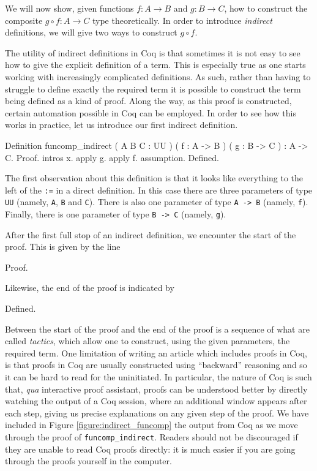 We will now show, given functions $f:A\to B$ and $g:B\to C$, how to
construct the composite $g\circ f : A \to C$ type theoretically.  In
order to introduce \emph{indirect} definitions, we will give two
ways to construct $g\circ f$.

The utility of indirect definitions in Coq is that sometimes it is not
easy to see how to give the explicit definition of a term.  This is
especially true as one starts working with increasingly complicated
definitions.  As such, rather than having to struggle to define
exactly the required term it is possible to construct the term being
defined as a kind of proof.  Along the way, as this proof is
constructed, certain automation possible in Coq can be employed.  In
order to see how this works in practice, let us introduce our first
indirect definition.
\begin{center}
  \begin{coqcode}[frame=single,backgroundcolor=\color{mylight},framerule=0pt]
Definition funcomp_indirect ( A B C : UU ) ( f : A -> B ) ( g : B -> C ) : A -> C.
Proof.
  intros x. apply g. apply f. assumption.
Defined.
  \end{coqcode}
\end{center}
The first observation about this definition is that it looks like
everything to the left of the \verb|:=| in a direct definition.
In this case there are three parameters of type \verb|UU|
(namely, \verb|A|, \verb|B| and \verb|C|).  There is
also one parameter of type \verb|A -> B| (namely,
\verb|f|).  Finally, there is one parameter of type \verb|B -> C| (namely, \verb|g|).  

After the first full stop of an indirect definition, we encounter the
start of the proof.  This is given by the line
\begin{center}
  \begin{coqcode}
Proof.
  \end{coqcode}
\end{center}
Likewise, the end of the proof is indicated by 
\begin{center}
  \begin{coqcode}
Defined.
  \end{coqcode}
\end{center}
Between the start of the proof and the end of the proof is a sequence
of what are called \emph{tactics}, which allow one to construct, using
the given parameters, the required term.  One limitation of writing an
article which includes proofs in Coq, is that proofs in Coq are
usually constructed using ``backward'' reasoning and so it can be hard to
read for the uninitiated.  In particular, the nature of Coq is such
that, \emph{qua} interactive proof assistant, proofs can be understood
better by directly watching the output of a Coq session, where an
additional window appears after each step, giving us precise
explanations on any given step of the proof.  We have included in
Figure \ref{figure:indirect_funcomp} the output from Coq as we move
through the proof of \verb|funcomp_indirect|.  Readers
should not be discouraged if they are unable to read Coq proofs
directly: it is much easier if you are going through the proofs yourself in the
computer.

